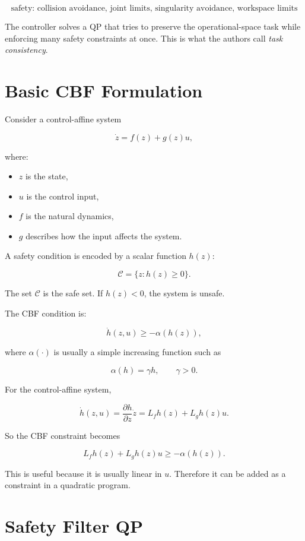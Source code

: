 \documentclass[11pt]{article}
\begin{document}
\[
\text{safety: collision avoidance, joint limits, singularity avoidance, workspace limits}
\]

The controller solves a QP that tries to preserve the operational-space task
while enforcing many safety constraints at once. This is what the authors call
\emph{task consistency}.

\section{Basic CBF Formulation}

Consider a control-affine system

\[
\dot{z} = f(z) + g(z)u,
\]

where:

\begin{itemize}[leftmargin=*]
    \item $z$ is the state,
    \item $u$ is the control input,
    \item $f$ is the natural dynamics,
    \item $g$ describes how the input affects the system.
\end{itemize}

A safety condition is encoded by a scalar function $h(z)$:

\[
\mathcal{C} = \{z : h(z) \ge 0\}.
\]

The set $\mathcal{C}$ is the safe set. If $h(z) < 0$, the system is unsafe.

The CBF condition is:

\[
\dot{h}(z,u) \ge -\alpha(h(z)),
\]

where $\alpha(\cdot)$ is usually a simple increasing function such as

\[
\alpha(h) = \gamma h, \qquad \gamma > 0.
\]

For the control-affine system,

\[
\dot{h}(z,u)
= \frac{\partial h}{\partial z}\dot{z}
= L_f h(z) + L_g h(z)u.
\]

So the CBF constraint becomes

\[
L_f h(z) + L_g h(z)u \ge -\alpha(h(z)).
\]

This is useful because it is usually linear in $u$. Therefore it can be added
as a constraint in a quadratic program.

\section{Safety Filter QP}
\end{document}
